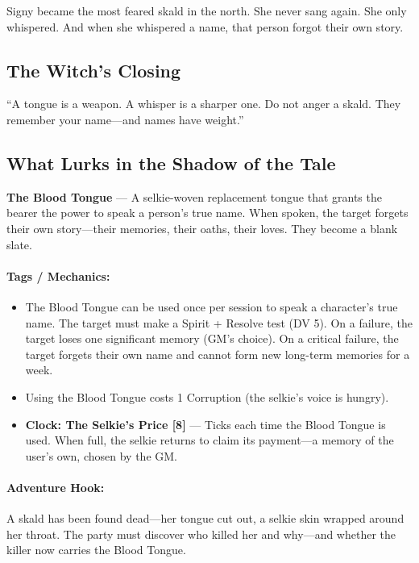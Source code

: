 \documentclass[9pt,a5paper]{extbook}
\begin{document}
Signy became the most feared skald in the north. She never sang again. She only whispered. And when she whispered a name, that person forgot their own story.

\subsection*{The Witch's Closing}

``A tongue is a weapon. A whisper is a sharper one. Do not anger a skald. They remember your name---and names have weight.''

\subsection*{What Lurks in the Shadow of the Tale}

\textbf{The Blood Tongue} --- A selkie-woven replacement tongue that grants the bearer the power to speak a person's true name. When spoken, the target forgets their own story---their memories, their oaths, their loves. They become a blank slate.

\paragraph{Tags / Mechanics:}
\begin{itemize}
    \item The Blood Tongue can be used once per session to speak a character's true name. The target must make a Spirit + Resolve test (DV 5). On a failure, the target loses one significant memory (GM's choice). On a critical failure, the target forgets their own name and cannot form new long-term memories for a week.
    \item Using the Blood Tongue costs 1 Corruption (the selkie's voice is hungry).
    \item \textbf{Clock: The Selkie's Price [8]} --- Ticks each time the Blood Tongue is used. When full, the selkie returns to claim its payment---a memory of the user's own, chosen by the GM.
\end{itemize}

\paragraph{Adventure Hook:}
A skald has been found dead---her tongue cut out, a selkie skin wrapped around her throat. The party must discover who killed her and why---and whether the killer now carries the Blood Tongue.
\end{document}
